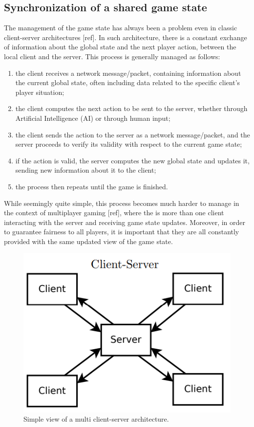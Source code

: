 \subsection{Synchronization of a shared game state}
The management of the game state has always been a problem even in classic client-server architectures [ref]. In such architecture, there is a constant exchange of information about the global state and the next player action, between the local client and the server. This process is generally managed as follows:
\begin{enumerate}
	\item the client receives a network message/packet, containing information about the current global state, often including data related to the specific client's player situation;
	\item the client computes the next action to be sent to the server, whether through Artificial Intelligence (AI) or through human input;
	\item the client sends the action to the server as a network message/packet, and the server proceeds to verify its validity with respect to the current game state;
	\item if the action is valid, the server computes the new global state and updates it, sending new information about it to the client;
	\item the process then repeats until the game is finished.
\end{enumerate}
While seemingly quite simple, this process becomes much harder to manage in the context of multiplayer gaming [ref], where the is more than one client interacting with the server and receiving game state updates. Moreover, in order to guarantee fairness to all players, it is important that they are all constantly provided with the same updated view of the game state.
\begin{figure}[h!]
	\centering
	\includegraphics[width=0.55\linewidth]{immagini/State-of-the-art/simple-client-server}
	\caption[Simple view of a multi client-server architecture.]{Simple view of a multi client-server architecture.}
	\label{fig:simple-client-server}
\end{figure}
